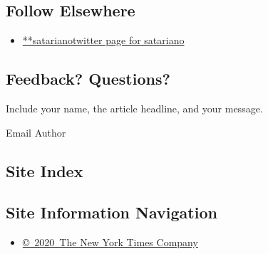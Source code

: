 \hypertarget{follow-elsewhere}{%
\subsection{Follow Elsewhere}\label{follow-elsewhere}}

\begin{itemize}
\tightlist
\item
  \href{https://twitter.com/satariano}{**satarianotwitter page for
  satariano}
\end{itemize}

\hypertarget{feedback-questions}{%
\subsection{Feedback? Questions?}\label{feedback-questions}}

Include your name, the article headline, and your message.

Email Author

\hypertarget{site-index}{%
\subsection{Site Index}\label{site-index}}

\hypertarget{site-information-navigation}{%
\subsection{Site Information
Navigation}\label{site-information-navigation}}

\begin{itemize}
\tightlist
\item
  \href{https://help.nytimes3xbfgragh.onion/hc/en-us/articles/115014792127-Copyright-notice}{©~2020~The
  New York Times Company}
\end{itemize}

